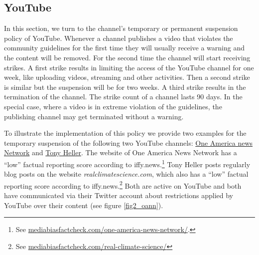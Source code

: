 \documentclass{article}
\begin{document}
\subsection{YouTube}

In this section, we turn to the channel's temporary or permanent suspension policy of YouTube. Whenever a channel publishes a video that violates the community guidelines for the first time they will  usually receive a warning and the content will be removed. For the second time the channel will start receiving strikes. A first strike results in limiting the access of the YouTube channel  for one week, like uploading videos, streaming and other activities. Then a second strike is similar but the suspension will be for two weeks. A third strike results in the termination of the channel. The strike count of a channel lasts 90 days.  In the special case, where a video is in extreme violation of the guidelines, the publishing channel may get terminated without a warning. 

\smallskip

To illustrate the implementation of this policy we provide two examples for the temporary suspension of the following two YouTube channels: \href{https://www.youtube.com/channel/UCNbIDJNNgaRrXOD7VllIMRQ}{One America news Network} and \href{https://www.youtube.com/user/TonyHeller1}{Tony Heller}. The website of One America News Network has a ``low'' factual reporting score according to iffy.news.\footnote{See \href{https://mediabiasfactcheck.com/one-america-news-network/}{mediabiasfactcheck.com/one-america-news-network/}.}  Tony Heller posts regularly blog posts on the website {\it realclimatescience.com}, which also has a ``low'' factual reporting score according to iffy.news.\footnote{See \href{https://mediabiasfactcheck.com/real-climate-science/}{mediabiasfactcheck.com/real-climate-science/}} Both are active on YouTube and both have communicated via their Twitter account about restrictions applied by YouTube over their content (see figure \ref{fig2_oann}).
\end{document}
